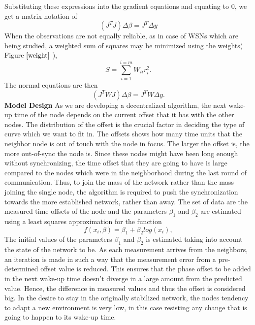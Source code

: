 \documentclass[journal]{IEEEtran}
\begin{document}
Substituting these expressions into the gradient equations and
equating to $0$, we get a matrix notation of
\begin{equation}
    \left(J^TJ\right)\Delta  \beta=J^T\Delta y
\end{equation}
When the observations are not equally reliable, as in case of WSNs
which are being studied, a weighted sum of squares may be minimized
using the weights( Figure $\ref{weight}$ ),
\begin{equation}
    S=\sum_{i=1}^{i=m}W_{ii}r_i^2.
\end{equation}
The normal equations are then
\begin{equation}
    \left(J^TWJ\right)\Delta  \beta=J^TW\Delta y.
\end{equation}
\textbf{Model Design}\newline
As we are developing a decentralized algorithm, the
next wake-up time of the node depends on the current offset that it
has with the other nodes. The distribution of the offset is the
crucial factor in deciding the type of curve which we want to fit
in. The offsets shows how many time units that the neighbor node is
out of touch with the node in focus. The larger the offset is, the
more out-of-sync the node is.\newline 
Since these nodes might have been long enough without synchronizing,
the time offset that they are going to have is large compared to the
nodes which were in the neighborhood during the last round of
communication. Thus, to join the mass of the network rather than the
mass joining the single node, the algorithm is required to push the
synchronization towards the more established network, rather than
away.\newline 
The set of data are the measured time offsets of the node and the
parameters $\beta_1$ and $\beta_2$ are estimated using a least
squares approximation for the function 
\begin{equation}
 f(x_i,\beta)= \beta _1 + \beta_2log(x_i),
\end{equation}
The initial values of the parameters $\beta_1$ and $\beta_2$ is estimated taking into account
the state of the network to be. \newline
As each measurement arrives from the neighbors, an iteration is made in such a way that
the measurement error from a pre-determined offset value is reduced.
This ensures that the phase offset to be added in the next wake-up
time doesn't diverge in a large amount from the predicted value.
Hence, the difference in measured values and thus the offset is
considered big. In the desire to stay in the originally stabilized
network, the nodes tendency to adapt a new environment is very low,
in this case resisting any change that is going to happen to its
wake-up time.
\end{document}
